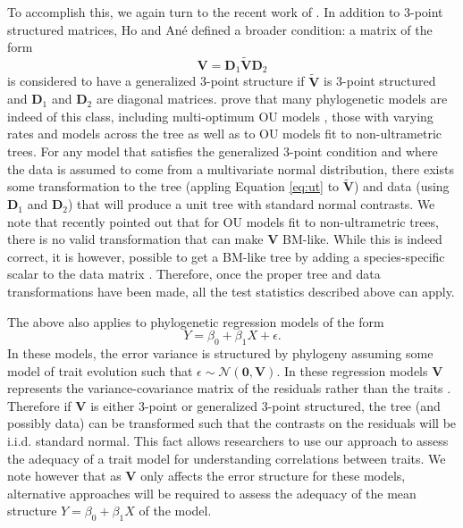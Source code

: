 To accomplish this, we again turn to the recent work of \citet{Ho2014}. In addition to 3-point structured matrices, Ho and An\'{e} defined a broader condition: a matrix of the form
\[\mathbf{V}=\mathbf{D}_1 \widetilde{\mathbf{V}}\mathbf{D}_2\]
is considered to have a generalized 3-point structure if $\widetilde{\mathbf{V}}$ is 3-point structured and $\mathbf{D}_1$ and $\mathbf{D}_2$ are diagonal matrices. \citet{Ho2014} prove that many phylogenetic models are indeed of this class, including multi-optimum OU models \citep{ButlerKing2004, IngramMahler2013, UyedaBayou}, those with varying rates and models across the tree \citep[e.g.,][]{Beaulieu2012} as well as to OU models fit to non-ultrametric trees. For any model that satisfies the generalized 3-point condition and where the data is assumed to come from a multivariate normal distribution, there exists some transformation to the tree (appling Equation \ref{eq:ut} to $\widetilde{\mathbf{V}}$) and data (using $\mathbf{D}_1$ and $\mathbf{D}_2$) that will produce a unit tree with standard normal contrasts. We note that \citet{Slater2014} recently pointed out that for OU models fit to non-ultrametric trees, there is no valid transformation that can make $\mathbf{V}$ BM-like. While this is indeed correct, it is however, possible to get a BM-like tree by adding a species-specific scalar to the data matrix \citep{Ho2014}. Therefore, once the proper tree and data transformations have been made, all the test statistics described above can apply.

The above also applies to phylogenetic regression models \citep{Grafen1989, Lynch1991, MartinsHansen1997} of the form
\[Y = \beta_0 + \beta_1 X + \epsilon.\]
In these models, the error variance is structured by phylogeny assuming some model of trait evolution such that $\epsilon \sim \mathcal{N}(\mathbf{0}, \mathbf{V})$. In these regression models $\mathbf{V}$ represents the variance-covariance matrix of the residuals rather than the traits \citep{Rohlf2001}. Therefore if $\mathbf{V}$ is either 3-point or generalized 3-point structured, the tree (and possibly data) can be transformed such that the contrasts on the residuals will be i.i.d. standard normal. This fact allows researchers to use our approach to assess the adequacy of a trait model for understanding correlations between traits. We note however that as $\mathbf{V}$ only affects the error structure for these models, alternative approaches \citep[see for example][ch. 6]{Gelmanbook} will be required to assess the adequacy of the mean structure $Y = \beta_0 + \beta_1X$ of the model.

